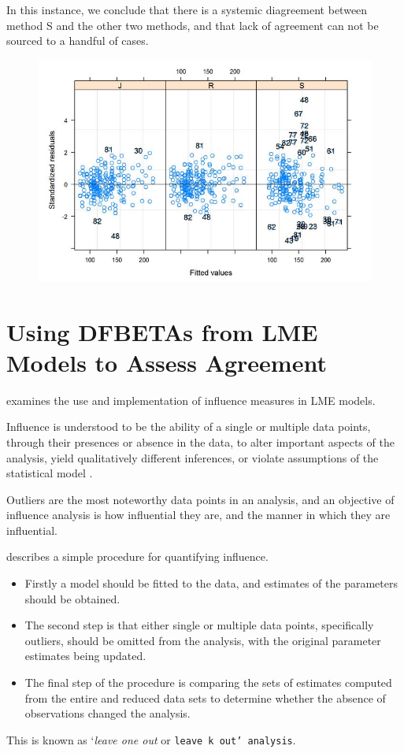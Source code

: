 In this instance, we conclude that there is a systemic diagreement between method S and the other two methods, and that lack of agreement can not be sourced to a handful of cases.
\begin{figure}[h!]
	\centering
	\includegraphics[width=0.7\linewidth]{images/bloodnlmeResidPlot2B}
\end{figure}


\newpage


\chapter{Using DFBETAs from LME Models to Assess Agreement}
	
	
	\citet{schab} examines the use and implementation of influence measures in LME models.
	
	Influence is understood to be the ability of a single or multiple data points, through their presences or absence in the data, to alter important aspects of the analysis, yield qualitatively 	different inferences, or violate assumptions of the statistical
	model \citep{schab}.
	
	Outliers are the most noteworthy data points in an analysis, and an objective of influence analysis is how influential they are,
	and the manner in which they are influential.
	
	\citet{schab} describes a simple procedure for quantifying influence.
	\begin{itemize}
		\item Firstly a model should be fitted to the data, and
		estimates of the parameters should be obtained.
		\item The second step is that either single or multiple data points, specifically outliers,
		should be omitted from the analysis, with the original parameter
		estimates being updated.
		\item  The final step of the procedure is comparing the 	sets of estimates computed from the entire and reduced data sets
		to determine whether the absence of observations changed the
		analysis.
	\end{itemize}
	   This is known as `\textit{leave one out} or \texttt{leave k
	out' analysis}.
	


